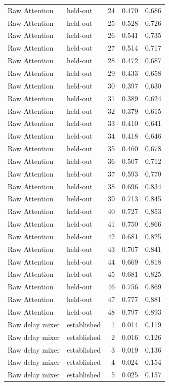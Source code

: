 \begin{tabular}{llrrr}
Raw Attention & held-out & 24 & 0.470 & 0.686 \\
Raw Attention & held-out & 25 & 0.528 & 0.726 \\
Raw Attention & held-out & 26 & 0.541 & 0.735 \\
Raw Attention & held-out & 27 & 0.514 & 0.717 \\
Raw Attention & held-out & 28 & 0.472 & 0.687 \\
Raw Attention & held-out & 29 & 0.433 & 0.658 \\
Raw Attention & held-out & 30 & 0.397 & 0.630 \\
Raw Attention & held-out & 31 & 0.389 & 0.624 \\
Raw Attention & held-out & 32 & 0.379 & 0.615 \\
Raw Attention & held-out & 33 & 0.410 & 0.641 \\
Raw Attention & held-out & 34 & 0.418 & 0.646 \\
Raw Attention & held-out & 35 & 0.460 & 0.678 \\
Raw Attention & held-out & 36 & 0.507 & 0.712 \\
Raw Attention & held-out & 37 & 0.593 & 0.770 \\
Raw Attention & held-out & 38 & 0.696 & 0.834 \\
Raw Attention & held-out & 39 & 0.713 & 0.845 \\
Raw Attention & held-out & 40 & 0.727 & 0.853 \\
Raw Attention & held-out & 41 & 0.750 & 0.866 \\
Raw Attention & held-out & 42 & 0.681 & 0.825 \\
Raw Attention & held-out & 43 & 0.707 & 0.841 \\
Raw Attention & held-out & 44 & 0.669 & 0.818 \\
Raw Attention & held-out & 45 & 0.681 & 0.825 \\
Raw Attention & held-out & 46 & 0.756 & 0.869 \\
Raw Attention & held-out & 47 & 0.777 & 0.881 \\
Raw Attention & held-out & 48 & 0.797 & 0.893 \\
Raw delay mixer & established & 1 & 0.014 & 0.119 \\
Raw delay mixer & established & 2 & 0.016 & 0.126 \\
Raw delay mixer & established & 3 & 0.019 & 0.136 \\
Raw delay mixer & established & 4 & 0.024 & 0.154 \\
Raw delay mixer & established & 5 & 0.025 & 0.157 \\

\end{tabular}
